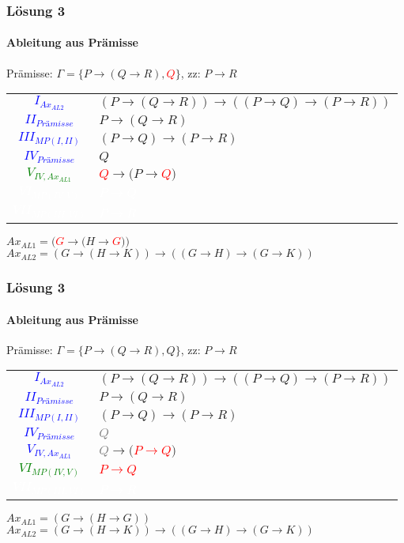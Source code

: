 \documentclass{beamer}
\begin{document}
	\begin{frame}
		\frametitle{Lösung 3}
		\framesubtitle{Ableitung aus Prämisse}
		Prämisse: $\Gamma =\{P\rightarrow(Q\rightarrow R), $\textcolor{red}{$Q$}$\}$, zz: $P\rightarrow R$\\
		\begin{tabular}{cl}
			\textcolor{blue}{$I_{Ax_{AL2}}$} & $(P\rightarrow(Q\rightarrow R))\rightarrow((P\rightarrow Q)\rightarrow(P\rightarrow R))$\\
			\textcolor{blue}{$II_{Prämisse}$} & $P\rightarrow(Q\rightarrow R)$\\
			\textcolor{blue}{$III_{MP(I, II)}$} & $(P\rightarrow Q)\rightarrow(P\rightarrow R)$\\
			\textcolor{blue}{$IV_{Prämisse}$} & $Q$\\
			\textcolor{green}{$V_{IV, Ax_{AL1}}$} & \textcolor{red}{$Q$}$\rightarrow(P\rightarrow $\textcolor{red}{$Q$}$)$\\
			\textcolor{white}{$VI_{MP(IV, V)}$} & \textcolor{white}{$P\rightarrow Q$}\\
			\textcolor{white}{$VII_{MP(III, VI)}$} & \textcolor{white}{$P\rightarrow R$}\\
		\end{tabular}
		$Ax_{AL1} = ($\textcolor{red}{$G$}$\rightarrow(H\rightarrow $\textcolor{red}{$G$}$))$\\
		$Ax_{AL2} = (G\rightarrow(H\rightarrow K))\rightarrow((G\rightarrow H)\rightarrow(G\rightarrow K))$\\
	\end{frame}
	\begin{frame}
		\frametitle{Lösung 3}
		\framesubtitle{Ableitung aus Prämisse}
		Prämisse: $\Gamma =\{P\rightarrow(Q\rightarrow R), Q\}$, zz: $P\rightarrow R$\\
		\begin{tabular}{cl}
			\textcolor{blue}{$I_{Ax_{AL2}}$} & $(P\rightarrow(Q\rightarrow R))\rightarrow((P\rightarrow Q)\rightarrow(P\rightarrow R))$\\
			\textcolor{blue}{$II_{Prämisse}$} & $P\rightarrow(Q\rightarrow R)$\\
			\textcolor{blue}{$III_{MP(I, II)}$} & $(P\rightarrow Q)\rightarrow(P\rightarrow R)$\\
			\textcolor{blue}{$IV_{Prämisse}$} & \textcolor{gray}{$Q$}\\
			\textcolor{blue}{$V_{IV, Ax_{AL1}}$} & \textcolor{gray}{$Q$}$\rightarrow($\textcolor{red}{$P\rightarrow Q$}$)$\\
			\textcolor{green}{$VI_{MP(IV, V)}$} & \textcolor{red}{$P\rightarrow Q$}\\
			\textcolor{white}{$VII_{MP(III, VI)}$} & \textcolor{white}{$P\rightarrow R$}\\
		\end{tabular}
		$Ax_{AL1} = (G\rightarrow(H\rightarrow G))$\\
		$Ax_{AL2} = (G\rightarrow(H\rightarrow K))\rightarrow((G\rightarrow H)\rightarrow(G\rightarrow K))$\\
	\end{frame}
\end{document}
